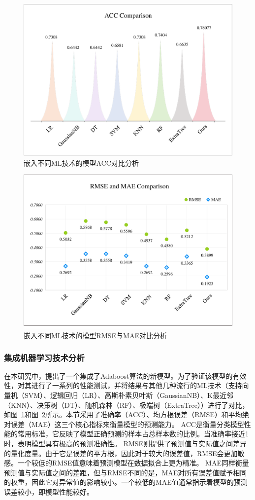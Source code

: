     \begin{figure}[ht]
      \centering
      \includegraphics[width=0.85\linewidth]{figs/paper5accML.pdf}
      \caption{嵌入不同ML技术的模型ACC对比分析}\label{paper5accML}
     \end{figure}

     
    \begin{figure}[ht]
      \centering
      \includegraphics[width=0.85\linewidth]{figs/paper5rmsemaeML.pdf}
      \caption{嵌入不同ML技术的模型RMSE与MAE对比分析}\label{paper5rmsemaeML}
     \end{figure}
     
\subsubsection{集成机器学习技术分析}
在本研究中，提出了一个集成了Adaboost算法的新模型。为了验证该模型的有效性，对其进行了一系列的性能测试，并将结果与其他几种流行的ML技术（支持向量机（SVM）、逻辑回归（LR）、高斯朴素贝叶斯（GaussianNB）、K最近邻（KNN）、决策树（DT）、随机森林（RF）、极端树（ExtraTree））进行了对比，如图~\ref{paper5accML}和图~\ref{paper5rmsemaeML}所示。本节采用了准确率（ACC）、均方根误差（RMSE）和平均绝对误差（MAE）这三个核心指标来衡量模型的预测能力。
ACC是衡量分类模型性能的常用标准，它反映了模型正确预测的样本占总样本数的比例。当准确率接近1时，表明模型具有极高的预测准确性。
RMSE则提供了预测值与实际值之间差异的量化度量。由于它是误差的平方根，因此对于较大的误差值，RMSE会更加敏感。一个较低的RMSE值意味着预测模型在数据拟合上更为精准。
MAE同样衡量预测值与实际值之间的差距，但与RMSE不同的是，MAE对所有误差值赋予相同的权重，因此它对异常值的影响较小。一个较低的MAE值通常指示着模型的预测误差较小，即模型性能较好。

